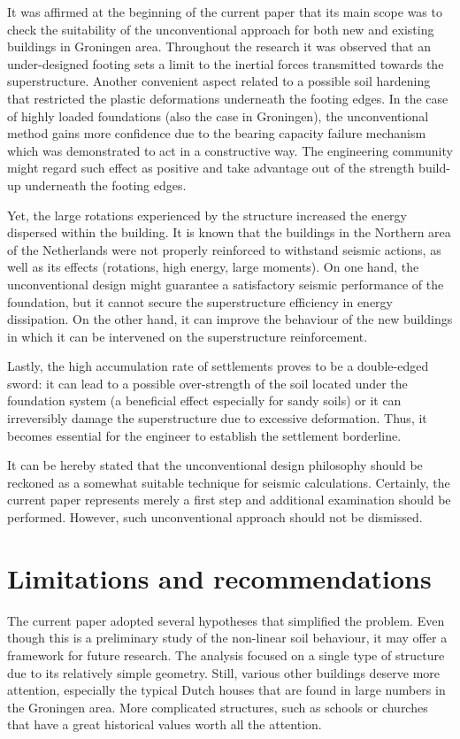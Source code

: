  It was affirmed at the beginning of the current paper that its main scope was to check the suitability of the unconventional approach for both new and existing buildings in Groningen area. Throughout the research it was observed that an under-designed footing sets a limit to the inertial forces transmitted towards the superstructure. Another convenient aspect related to a possible soil hardening that restricted the plastic deformations underneath the footing edges. In the case of highly loaded foundations (also the case in Groningen), the unconventional method gains more confidence due to the bearing capacity failure mechanism which was demonstrated to act in a constructive way. The engineering community might regard such effect as positive and take advantage out of the strength build-up underneath the footing edges. 
  
 Yet, the large rotations experienced by the structure increased the energy dispersed within the building. It is known that the buildings in the Northern area of the Netherlands were not properly reinforced to withstand seismic actions, as well as its effects (rotations, high energy, large moments). On one hand, the unconventional design might guarantee a satisfactory seismic performance of the foundation, but it cannot secure the superstructure efficiency in energy dissipation. On the other hand, it can improve the behaviour of the new buildings in which it can be intervened on the superstructure reinforcement. 
 
 Lastly, the high accumulation rate of settlements proves to be a double-edged sword: it can lead to a possible over-strength of the soil located under the foundation system (a beneficial effect especially for sandy soils) or it can irreversibly damage the superstructure due to excessive deformation. Thus, it becomes essential for the engineer to establish the settlement borderline.
 
 It can be hereby stated that the unconventional design philosophy should be reckoned as a somewhat suitable technique for seismic calculations. Certainly, the current paper represents merely a first step and additional examination should be performed. However, such unconventional approach should not be dismissed. 
 
 \newpage
\section{Limitations and recommendations}
The current paper adopted several hypotheses that simplified the problem. Even though this is a preliminary study of the non-linear soil behaviour, it may offer a framework for future research. The analysis focused on a single type of structure due to its relatively simple geometry. Still, various other buildings deserve more attention, especially the typical Dutch houses that are found in large numbers in the Groningen area. More complicated structures, such as schools or churches that have a great historical values worth all the attention. 

